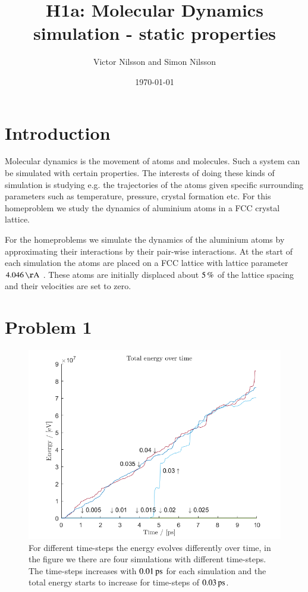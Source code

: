 



\title{H1a: Molecular Dynamics simulation - static properties}
\author{Victor Nilsson and Simon Nilsson}
\date{\today}





\section*{Introduction}

Molecular dynamics is the movement of atoms and molecules. Such a system can be simulated with certain properties. The interests of doing these kinds of simulation is studying e.g. the trajectories of the atoms given specific surrounding parameters such as temperature, pressure, crystal formation etc. For this homeproblem we study the dynamics of aluminium atoms in a FCC crystal lattice.

For the homeproblems we simulate the dynamics of the aluminium atoms by approximating their interactions by their pair-wise interactions. At the start of each simulation the atoms are placed on a FCC lattice with lattice parameter $\unit[4.046]{\AA}$ \cite{al_wiki}. These atoms are initially displaced about $\unit[5]{\%}$ of the lattice spacing and their velocities are set to zero.

\section*{Problem 1}

\begin{figure}[H]
    \centering
    \includegraphics[width=\textwidth]{graphics/task1/energy.png}
    \caption{For different time-steps the energy evolves differently over time, in the figure we there are four simulations with different time-steps. The time-steps increases with $\unit[0.01]{ps}$ for each simulation and the total energy starts to increase for time-steps of $\unit[0.03]{ps}$.}
    \label{fig:timestep}
\end{figure}

